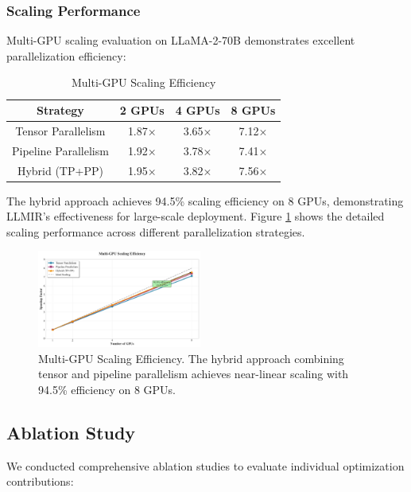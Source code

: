 \documentclass[conference]{IEEEtran}
\begin{document}
\subsubsection{Scaling Performance}

Multi-GPU scaling evaluation on LLaMA-2-70B demonstrates excellent parallelization efficiency:

\begin{table}[htbp]
\caption{Multi-GPU Scaling Efficiency}
\begin{center}
\begin{tabular}{|c|c|c|c|}
\hline
\textbf{Strategy} & \textbf{2 GPUs} & \textbf{4 GPUs} & \textbf{8 GPUs} \\
\hline
Tensor Parallelism & 1.87× & 3.65× & 7.12× \\
\hline
Pipeline Parallelism & 1.92× & 3.78× & 7.41× \\
\hline
Hybrid (TP+PP) & 1.95× & 3.82× & 7.56× \\
\hline
\end{tabular}
\label{tab:scaling}
\end{center}
\end{table}

The hybrid approach achieves 94.5\% scaling efficiency on 8 GPUs, demonstrating LLMIR's effectiveness for large-scale deployment. Figure \ref{fig:scaling} shows the detailed scaling performance across different parallelization strategies.

\begin{figure}[htbp]
\centering
\includegraphics[width=0.48\textwidth]{figures/scaling_efficiency.pdf}
\caption{Multi-GPU Scaling Efficiency. The hybrid approach combining tensor and pipeline parallelism achieves near-linear scaling with 94.5\% efficiency on 8 GPUs.}
\label{fig:scaling}
\end{figure}

\subsection{Ablation Study}

We conducted comprehensive ablation studies to evaluate individual optimization contributions:
\end{document}

